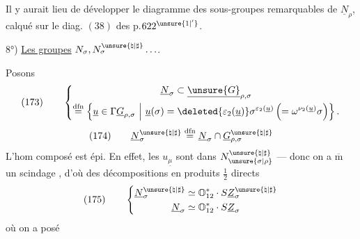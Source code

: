 Il y aurait lieu de développer le diagramme des sous-groupes
remarquables de \(\underline N_\rho\), calqué sur
le diag. \((38)\) des p.\(622^{\unsure{1|'}}\).



8°) \uline{Les groupes} \(N_\sigma,N_\sigma^{\unsure{\natural|\sharp}}\ldots\).

Posons
\[
(173)\qquad
\left\{
\begin{gathered}
\underline N_\sigma\subset\underline{\unsure{G}}_{\rho,\sigma}\\
\mathrel{\overset{\mathrm{dfn}}{=}}
\left\{\underline u\in\Gamma\underline G_{\rho,\sigma}\ \middle|\
\underline u(\sigma)=
\deleted{\varepsilon_2(\underline u)}
\sigma^{\varepsilon_2(\underline u)}
\left(=\omega^{\nu_2(\underline u)}\sigma\right)\right\}.
\end{gathered}
\right.
\]
\[
(174)\qquad
\underline N_\sigma^{\unsure{\natural|\sharp}}
\mathrel{\overset{\mathrm{dfn}}{=}}
\underline N_\sigma\cap\underline G_{\rho,\sigma}^{\unsure{\natural|\sharp}}
\]
L'hom composé
est épi. En effet, les \(u_{\underline\mu}\) sont dans
\(N_{\unsure{\sigma|\rho}}^{\unsure{\natural|\sharp}}\) --- donc on a $\overline{\mathrm m}$ un scindage
,
d'où des décompositions en produits \(\frac12\) directs
\[
(175)\qquad
\left\{
\begin{aligned}
\underline N_\sigma^{\unsure{\natural|\sharp}}
&\simeq\mathbb O_{12}^{*}\cdot S\underline Z_\sigma^{\unsure{\natural|\sharp}}\\
\underline N_\sigma
&\simeq\mathbb O_{12}^{*}\cdot S\underline Z_\sigma
\end{aligned}
\right.
\]
où on a posé
